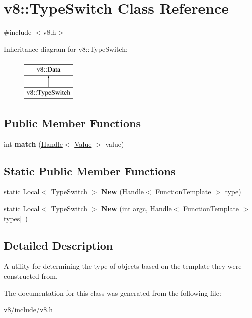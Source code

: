 \hypertarget{classv8_1_1TypeSwitch}{\section{v8\-:\-:Type\-Switch Class Reference}
\label{classv8_1_1TypeSwitch}
}


{\ttfamily \#include $<$v8.\-h$>$}

Inheritance diagram for v8\-:\-:Type\-Switch\-:\begin{figure}[H]
\begin{center}
\leavevmode
\includegraphics[height=2.000000cm]{classv8_1_1TypeSwitch}
\end{center}
\end{figure}
\subsection*{Public Member Functions}
\begin{DoxyCompactItemize}
\item 
\hypertarget{classv8_1_1TypeSwitch_a678fe45db1e97ba46df7359b51752483}{int {\bfseries match} (\hyperlink{classv8_1_1Handle}{Handle}$<$ \hyperlink{classv8_1_1Value}{Value} $>$ value)}\label{classv8_1_1TypeSwitch_a678fe45db1e97ba46df7359b51752483}

\end{DoxyCompactItemize}
\subsection*{Static Public Member Functions}
\begin{DoxyCompactItemize}
\item 
\hypertarget{classv8_1_1TypeSwitch_ac94aac0b1ba0bde763bc8b6ae6aea532}{static \hyperlink{classv8_1_1Local}{Local}$<$ \hyperlink{classv8_1_1TypeSwitch}{Type\-Switch} $>$ {\bfseries New} (\hyperlink{classv8_1_1Handle}{Handle}$<$ \hyperlink{classv8_1_1FunctionTemplate}{Function\-Template} $>$ type)}\label{classv8_1_1TypeSwitch_ac94aac0b1ba0bde763bc8b6ae6aea532}

\item 
\hypertarget{classv8_1_1TypeSwitch_a47003915e553a7ca2285b8a0bf42993b}{static \hyperlink{classv8_1_1Local}{Local}$<$ \hyperlink{classv8_1_1TypeSwitch}{Type\-Switch} $>$ {\bfseries New} (int argc, \hyperlink{classv8_1_1Handle}{Handle}$<$ \hyperlink{classv8_1_1FunctionTemplate}{Function\-Template} $>$ types\mbox{[}$\,$\mbox{]})}\label{classv8_1_1TypeSwitch_a47003915e553a7ca2285b8a0bf42993b}

\end{DoxyCompactItemize}


\subsection{Detailed Description}
A utility for determining the type of objects based on the template they were constructed from. 

The documentation for this class was generated from the following file\-:\begin{DoxyCompactItemize}
\item 
v8/include/v8.\-h\end{DoxyCompactItemize}
